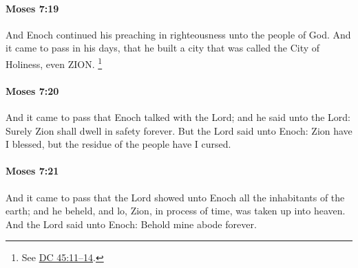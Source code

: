 		\paragraph{Moses 7:19} %
			\label{MOSES-7-19}

			And Enoch continued his preaching in righteousness unto the people of God. And it came to pass in his days, that he built a city that was called the City of Holiness, even ZION.%
				\footnote{%
					See \hyperref[DC45-11]{DC 45:11--14}.
					} 


		\paragraph{Moses 7:20} %
			\label{MOSES-7-20}

			And it came to pass that Enoch talked with the Lord; and he said unto the Lord: Surely Zion shall dwell in safety forever. But the Lord said unto Enoch: Zion have I blessed, but the residue of the people have I cursed.


		\paragraph{Moses 7:21} %
			\label{MOSES-7-21}

			And it came to pass that the Lord showed unto Enoch all the inhabitants of the earth; and he beheld, and lo, Zion, in process of time, was taken up into heaven. And the Lord said unto Enoch: Behold mine abode forever.

